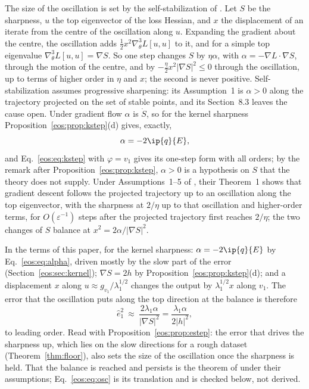 The size of the oscillation is set by the self-stabilization of \cite{damian2023}.
Let $S$ be the sharpness, $u$ the top eigenvector of the loss Hessian, and $x$ the displacement of an iterate from the centre of the oscillation along $u$.
Expanding the gradient about the centre, the oscillation adds $\frac12x^2\nabla^3_\theta L[u,u]$ to it, and for a simple top eigenvalue $\nabla^3_\theta L[u,u] = \nabla S$.
So one step changes $S$ by $\eta\alpha$, with $\alpha = -\nabla L\cdot\nabla S$, through the motion of the centre, and by $-\frac\eta2x^2|\nabla S|^2\le0$ through the oscillation, up to terms of higher order in $\eta$ and $x$; the second is never positive.
Self-stabilization assumes progressive sharpening: its Assumption~1 is $\alpha > 0$ along the trajectory projected on the set of stable points, and its Section~8.3 leaves the cause open.
Under gradient flow $\alpha$ is $\dot S$, so for the kernel sharpness Proposition~\ref{eos:prop:kstep}(d) gives, exactly,
\begin{equation}\label{eos:eq:alpha}
\alpha = -2\ip{q}{E},
\end{equation}
and Eq.~\eqref{eos:eq:kstep} with $\varphi = v_1$ gives its one-step form with all orders; by the remark after Proposition~\ref{eos:prop:kstep}, $\alpha > 0$ is a hypothesis on $S$ that the theory does not supply.
Under Assumptions~1--5 of \cite{damian2023}, their Theorem~1 shows that gradient descent follows the projected trajectory up to an oscillation along the top eigenvector, with the sharpness at $2/\eta$ up to that oscillation and higher-order terms, for $O(\varepsilon^{-1})$ steps after the projected trajectory first reaches $2/\eta$; the two changes of $S$ balance at $x^2 = 2\alpha/|\nabla S|^2$.

In the terms of this paper, for the kernel sharpness: $\alpha = -2\ip{q}{E}$ by Eq.~\eqref{eos:eq:alpha}, driven mostly by the slow part of the error (Section~\ref{eos:sec:kernel}); $\nabla S = 2h$ by Proposition~\ref{eos:prop:kstep}(d); and a displacement $x$ along $u\approx g_{v_1}/\lambda_1^{1/2}$ changes the output by $\lambda_1^{1/2}x$ along $v_1$. The error that the oscillation puts along the top direction at the balance is therefore
\begin{equation}\label{eos:eq:osc}
\hat e_1^2\ \approx\ \frac{2\lambda_1\alpha}{|\nabla S|^2} = \frac{\lambda_1\alpha}{2|h|^2},
\end{equation}
to leading order.
Read with Proposition~\ref{eos:prop:estep}: the error that drives the sharpness up, which lies on the slow directions for a rough dataset (Theorem~\ref{thm:floor}), also sets the size of the oscillation once the sharpness is held.
That the balance is reached and persists is the theorem of \cite{damian2023} under their assumptions; Eq.~\eqref{eos:eq:osc} is its translation and is checked below, not derived.

